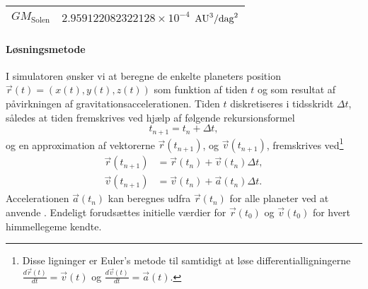 \documentclass{article}
\begin{document}
\begin{enumerate}[label=11g.\arabic*,start=0]
\begin{table}
\begin{center}
\begin{tabular}{|l|r|}
      $GM_{\mathrm{Solen}}$ & $2.959122082322128 \times 10^{-4}$ $\mathrm{AU}^3 / \mathrm{dag}^2$\\ \hline 
    \end{tabular}
  \end{center}
  \label{default}
\end{table}%

\paragraph{Løsningsmetode}
I simulatoren ønsker vi at beregne de enkelte planeters position $\vec{r}(t) = (x(t), y(t), z(t))$ som funktion af tiden $t$ og som resultat af påvirkningen af gravitationsaccelerationen. Tiden $t$ diskretiseres i tidsskridt $\Delta t$, således at tiden fremskrives ved hjælp af følgende rekursionsformel
\begin{equation}
  t_{n+1} = t_{n} + \Delta t,
\end{equation}
og en approximation af vektorerne $\vec{r}(t_{n+1})$, og $\vec{v}(t_{n+1})$, fremskrives ved\footnote{Disse ligninger er Euler's metode til samtidigt at løse differentialligningerne $\frac{d\vec{r}(t)}{dt} = \vec{v}(t)$ og $\frac{d\vec{v}(t)}{dt} = \vec{a}(t)$.}
\begin{align}
  \vec{r}(t_{n+1}) &= \vec{r}(t_{n}) + \vec{v}(t_{n}) \Delta t,
  \\\vec{v}(t_{n+1}) &= \vec{v}(t_{n}) + \vec{a}(t_{n}) \Delta t.
\end{align}
Accelerationen $\vec{a}(t_n)$ kan beregnes udfra $\vec{r}(t_n)$ for alle planeter ved at anvende . Endeligt forudsættes initielle værdier for  $\vec{r}(t_0)$ og $\vec{v}(t_0)$ for hvert himmellegeme kendte.
 

\end{enumerate}
\end{document}

